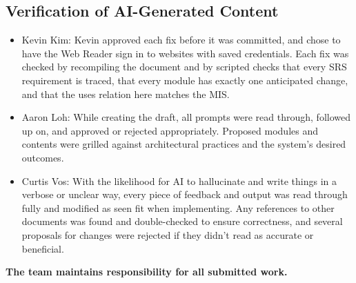 \documentclass[12pt, titlepage]{article}
\begin{document}
\subsection{Verification of AI-Generated Content}
\begin{itemize}
\item Kevin Kim: Kevin approved each fix before it was committed, and chose to have the Web
Reader sign in to websites with saved credentials. Each fix was checked by
recompiling the document and by scripted checks that every SRS requirement is
traced, that every module has exactly one anticipated change, and that the uses
relation here matches the MIS.
\item Aaron Loh: While creating the draft, all prompts were read through, followed up on, and approved or rejected appropriately.
Proposed modules and contents were grilled against architectural practices and the system's desired outcomes.
\item Curtis Vos: With the likelihood for AI to hallucinate and write things in a verbose or unclear way, every piece of feedback and output was 
read through fully and modified as seen fit when implementing. Any references to other documents was found and double-checked to ensure correctness,
and several proposals for changes were rejected if they didn't read as accurate or beneficial.
\end{itemize}

\textbf{The team maintains responsibility for all submitted work.}



\end{document}
